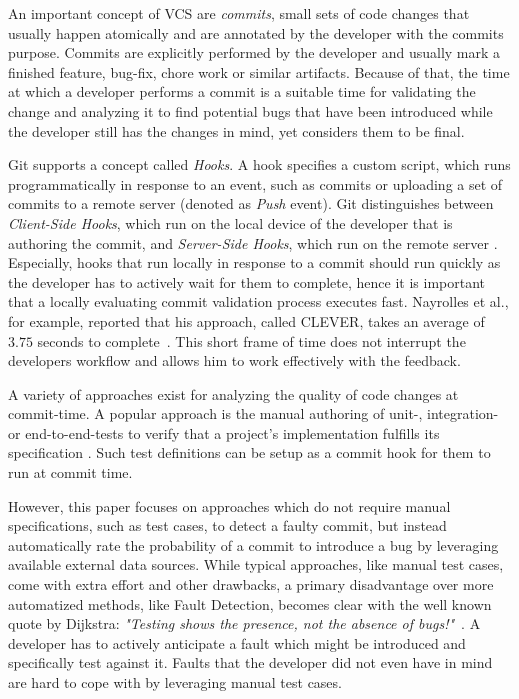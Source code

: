 An important concept of VCS are \textit{commits}, small sets of code changes that usually happen atomically and are annotated by the developer with the commits purpose. Commits are explicitly performed by the developer and usually mark a finished feature, bug-fix, chore work or similar artifacts. Because of that, the time at which a developer performs a commit is a suitable time for validating the change and analyzing it to find potential bugs that have been introduced while the developer still has the changes in mind, yet considers them to be final. %

Git supports a concept called \textit{Hooks}. A hook specifies a custom script, which runs programmatically in response to an event, such as commits or uploading a set of commits to a remote server (denoted as \textit{Push} event). 
Git distinguishes between \textit{Client-Side Hooks}, which run on the local device of the developer that is authoring the commit, and \textit{Server-Side Hooks}, which run on the remote server \cite{Chacon:2014:PG:2695634}. 
Especially, hooks that run locally in response to a commit should run quickly as the developer has to actively wait for them to complete, hence it is important that a locally evaluating commit validation process executes fast. Nayrolles et al., for example, reported that his approach, called CLEVER, takes an average of $3.75$ seconds to complete~\cite{Nayrolles2018}. This short frame of time does not interrupt the developers workflow and allows him to work effectively with the feedback.

A variety of approaches exist for analyzing the quality of code changes at commit-time. A popular approach is the manual authoring of unit-, integration- or end-to-end-tests to verify that a project's implementation fulfills its specification \cite{Maayan2018}. Such test definitions can be setup as a commit hook for them to run at commit time.

However, this paper focuses on approaches which do not require manual specifications, such as test cases, to detect a faulty commit, but instead automatically rate the probability of a commit to introduce a bug by leveraging available external data sources.
While typical approaches, like manual test cases, come with extra effort and other drawbacks, a primary disadvantage over more automatized methods, like Fault Detection, becomes clear with the well known quote by Dijkstra: \textit{"Testing shows the presence, not the absence of bugs!"}~\cite[p.~16]{JohnN1969}. A developer has to actively anticipate a fault which might be introduced and specifically test against it. Faults that the developer did not even have in mind are hard to cope with by leveraging manual test cases.

